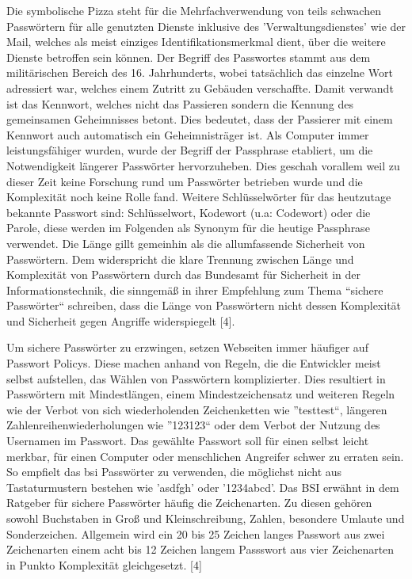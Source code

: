 \newpage

Die symbolische Pizza steht für die Mehrfachverwendung von teils schwachen Passwörtern für alle genutzten Dienste inklusive des 'Verwaltungsdienstes' wie der Mail, welches als meist einziges Identifikationsmerkmal dient, über die weitere Dienste betroffen sein können. Der Begriff des Passwortes stammt aus dem militärischen Bereich des 16. Jahrhunderts, wobei tatsächlich das einzelne Wort adressiert war, welches einem Zutritt zu Gebäuden verschaffte. Damit verwandt ist das Kennwort, welches nicht das Passieren sondern die Kennung des gemeinsamen Geheimnisses betont. Dies bedeutet, dass der Passierer mit einem Kennwort auch automatisch ein Geheimnisträger ist. Als Computer immer leistungsfähiger wurden, wurde der Begriff der Passphrase etabliert, um die Notwendigkeit längerer Passwörter hervorzuheben. Dies geschah vorallem weil zu dieser Zeit keine Forschung rund um Passwörter betrieben wurde und die Komplexität noch keine Rolle fand. Weitere Schlüsselwörter für das heutzutage bekannte Passwort sind: Schlüsselwort, Kodewort (u.a: Codewort) oder die Parole, diese werden im Folgenden als Synonym für die heutige Passphrase verwendet. Die Länge gillt gemeinhin als die allumfassende Sicherheit von Passwörtern. Dem widerspricht die klare Trennung zwischen Länge und Komplexität von Passwörtern durch das Bundesamt für Sicherheit in der Informationstechnik, die sinngemäß in ihrer Empfehlung zum Thema ``sichere Passwörter`` schreiben, dass die Länge von Passwörtern nicht dessen Komplexität und Sicherheit gegen Angriffe widerspiegelt [4].

Um sichere Passwörter zu erzwingen, setzen Webseiten immer häufiger auf Passwort Policys. Diese machen anhand von Regeln, die die Entwickler meist selbst aufstellen, das Wählen von Passwörtern komplizierter. Dies resultiert in Passwörtern mit Mindestlängen, einem Mindestzeichensatz und weiteren Regeln wie der Verbot von sich wiederholenden Zeichenketten wie ''testtest``, längeren Zahlenreihenwiederholungen wie ''123123`` oder dem Verbot der Nutzung des Usernamen im Passwort. Das gewählte Passwort soll für einen selbst leicht merkbar, für einen Computer oder menschlichen Angreifer schwer zu erraten sein. So empfielt das \ac{bsi} Passwörter zu verwenden, die möglichst nicht aus Tastaturmustern bestehen wie 'asdfgh' oder '1234abcd'. Das BSI erwähnt in dem Ratgeber für sichere Passwörter häufig die Zeichenarten. Zu diesen gehören sowohl Buchstaben in Groß und Kleinschreibung, Zahlen, besondere Umlaute und Sonderzeichen. Allgemein wird ein 20 bis 25 Zeichen langes Passwort aus zwei Zeichenarten einem acht bis 12 Zeichen langem Passswort aus vier Zeichenarten in Punkto Komplexität gleichgesetzt. [4]

